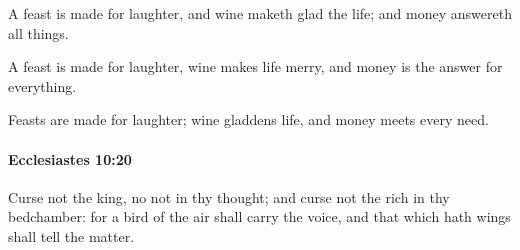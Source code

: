 			\begin{versebox}
					\item[BHS] 
					\item[LXX] 
					\item[ASV] A feast is made for laughter, and wine maketh glad the life; and money answereth all things.
					\item[NIV] A feast is made for laughter, wine makes life merry, and money is the answer for everything.
					\item[NRSV] Feasts are made for laughter; wine gladdens life, and money meets every need.
			\end{versebox}

		\paragraph{Ecclesiastes 10:20} %
			\label{ECCLESIASTES-10-20}

			Curse not the king, no not in thy thought; and curse not the rich in thy bedchamber: for a bird of the air shall carry the voice, and that which hath wings shall tell the matter.

